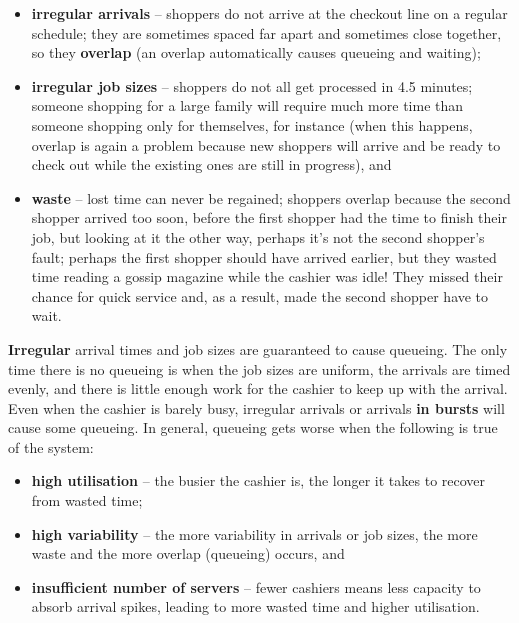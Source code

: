   \begin{itemize}
 \item \textbf{irregular arrivals} -- shoppers do not arrive at the checkout line on a regular schedule; they are sometimes spaced far apart and sometimes close together, so they \textbf{overlap} (an overlap automatically causes queueing and waiting);
 \item \textbf{irregular job sizes} -- shoppers do not all get processed in 4.5 minutes; someone shopping for a large family will require much more time than someone shopping only for themselves, for instance (when this happens, overlap is again a problem because new shoppers will arrive and be ready to check out while the existing ones are still in progress), and  
\item \textbf{waste} -- lost time can never be regained; shoppers overlap because the second shopper arrived too soon, before the first shopper had the time to finish their job, but looking at it the other way, perhaps it's not the second shopper's fault; perhaps the first shopper should have arrived earlier, but they wasted time reading a gossip magazine while the cashier was idle! They missed their chance for quick service and, as a result,  made the second shopper have to wait.
\end{itemize}
\textbf{Irregular} arrival times and job sizes are guaranteed to cause queueing. The only time there is no queueing is when the job sizes are uniform, the arrivals are timed evenly, and there is little enough work for the cashier to keep up with the arrival. Even when the cashier is barely busy, irregular arrivals or arrivals \textbf{in bursts} will cause some queueing. In general, queueing gets worse when the following is true of the system:
\begin{itemize}
\item \textbf{high utilisation} -- the busier the cashier is, the longer it takes to recover from wasted time; 
\item \textbf{high variability} -- the more variability in arrivals or job sizes, the more waste and the more overlap (queueing) occurs, and 
\item \textbf{insufficient number of servers} -- fewer cashiers means less capacity to absorb arrival spikes, leading to more wasted time and higher utilisation.
\end{itemize}